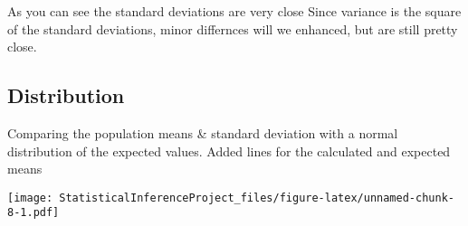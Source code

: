\documentclass[
]{article}
\begin{document}
As you can see the standard deviations are very close Since variance is
the square of the standard deviations, minor differnces will we
enhanced, but are still pretty close.

\hypertarget{distribution}{%
\subsection{Distribution}\label{distribution}}

Comparing the population means \& standard deviation with a normal
distribution of the expected values. Added lines for the calculated and
expected means

\texttt{[image: StatisticalInferenceProject\_files/figure-latex/unnamed-chunk-8-1.pdf]}
\end{document}
